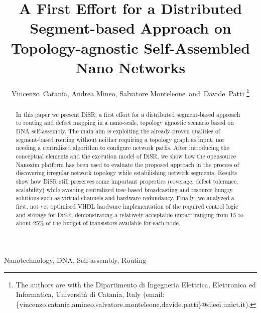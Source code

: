 \documentclass[final,journal,letterpaper]{IEEEtran}
\begin{document}

\title{A First Effort for a Distributed Segment-based Approach on Topology-agnostic
Self-Assembled Nano Networks} 

\author{Vincenzo~Catania, Andrea Mineo, Salvatore Monteleone~and~Davide~Patti%
\thanks{The authors are with the Dipartimento di Ingegneria
Elettrica, Elettronica ed Informatica, Universit\`a di Catania, Italy
(email: \{vincenzo.catania,amineo,salvatore.monteleone,davide.patti\}@dieei.unict.it).}}

\maketitle


\begin{abstract}
In this paper we present DiSR, a first effort for a distributed
segment-based approach to routing and defect mapping in a nano-scale,
topology agnostic scenario based on DNA self-assembly. The main aim is
exploiting the already-proven qualities of segment-based routing
without neither requiring a topology graph as input, nor needing a
centralized algorithm to configure network paths.  After introducing
the conceptual elements and the execution model of DiSR, we show how
the opensource Nanoxim platform has been used to evaluate the proposed
approach in the process of discovering irregular network topology
while estabilishing network segments.  Results show how DiSR still
preserves some important properties (coverage, defect tolerance,
scalability)  while avoiding centralized tree-based broadcasting and
resource hungry solutions such as virtual channels and hardware
redundancy. Finally, we analyzed a first, not yet optimised VHDL
hardware implementation of the required control logic and storage for
DiSR, demonstrating a relatively acceptable impact ranging from 15 to
about 25\% of the budget of transistors available for each node.
\end{abstract}


\begin{IEEEkeywords}
Nanotechnology, DNA, Self-assembly, Routing
\end{IEEEkeywords}
\end{document}

